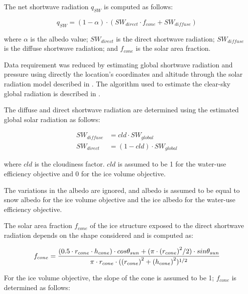 The net shortwave radiation $q_{SW}$ is computed as follows:

\begin{equation} 
q_{SW} = (1- \alpha) \cdot ( SW_{direct} \cdot f_{cone} + SW_{diffuse})
\end{equation}

where $\alpha$ is the albedo value; $SW_{direct}$ is the direct shortwave radiation; $SW_{diffuse}$ is the
diffuse shortwave radiation; and $f_{cone}$ is the solar area fraction.

Data requirement was reduced by estimating global shortwave radiation and pressure using directly the
location's coordinates and altitude through the solar radiation model described in
\citet{holmgrenPvlibPythonPython2018}. The algorithm used to estimate the clear-sky global radiation is
described in \citet{ineichenBroadbandSimplifiedVersion2008}.  

The diffuse and direct shortwave radiation are determined using the estimated global solar radiation as follows:

\begin{equation}
\begin{split}
  SW_{diffuse} &= cld \cdot SW_{global}\\
  SW_{direct} &= (1-cld) \cdot SW_{global}
\end{split}
\end{equation}

where $cld$ is the cloudiness factor. $cld$ is assumed to be 1 for the water-use efficiency objective and 0 for the ice volume
objective.

The variations in the albedo are ignored, and albedo is assumed to be equal to snow albedo for the
ice volume objective and the ice albedo for the water-use efficiency objective.

The solar area fraction $f_{cone}$ of the ice structure exposed to the direct shortwave radiation depends on the
shape considered and is computed as:

\begin{equation}
		f_{cone} =\frac{(0.5 \cdot r_{cone} \cdot h_{cone}) \cdot cos \theta_{sun} +(\pi \cdot
			{(r_{cone})}^2/2) \cdot sin \theta_{sun} }{\pi \cdot r_{cone} \cdot ({(r_{cone})}^2+{(h_{cone})}^2)^{1/2}}\\
\end{equation}

For the ice volume objective, the slope of the cone is assumed to be 1; $f_{cone}$ is determined as follows:

